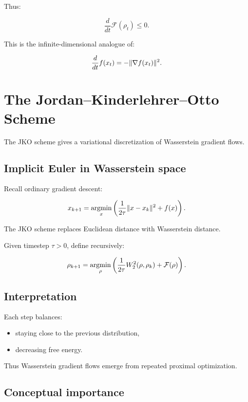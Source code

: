 Thus:

\[
\frac{d}{dt}\mathcal F(\rho_t) \le 0.
\]

\begin{remark}
This is the infinite-dimensional analogue of:

\[
\frac{d}{dt}f(x_t)
=
-\|\nabla f(x_t)\|^2.
\]
\end{remark}

\section{The Jordan--Kinderlehrer--Otto Scheme}

The JKO scheme gives a variational discretization of Wasserstein gradient flows.

\subsection{Implicit Euler in Wasserstein space}

Recall ordinary gradient descent:

\[
x_{k+1}
=
\operatorname*{argmin}_x
\left(
\frac{1}{2\tau}\|x-x_k\|^2
+
f(x)
\right).
\]

The JKO scheme replaces Euclidean distance with Wasserstein distance.

\begin{definition}
Given timestep $\tau>0$, define recursively:

\[
\rho_{k+1}
=
\operatorname*{argmin}_\rho
\left(
\frac{1}{2\tau}
W_2^2(\rho,\rho_k)
+
\mathcal F(\rho)
\right).
\]
\end{definition}

\subsection{Interpretation}

Each step balances:

\begin{itemize}
    \item staying close to the previous distribution,
    \item decreasing free energy.
\end{itemize}

Thus Wasserstein gradient flows emerge from repeated proximal optimization.

\subsection{Conceptual importance}

